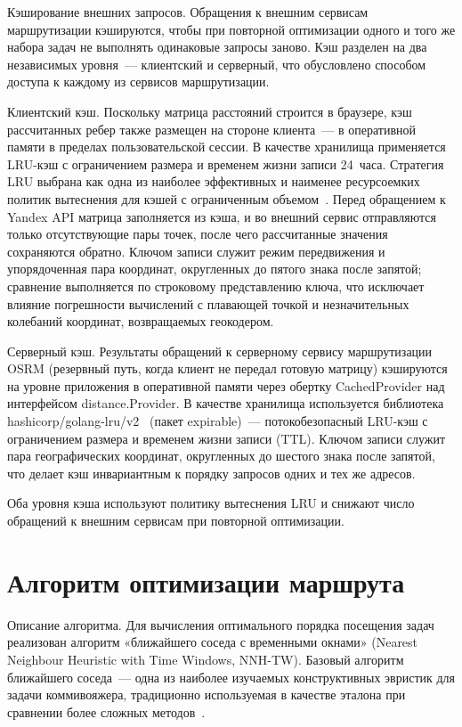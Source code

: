 Кэширование внешних запросов. Обращения к внешним сервисам маршрутизации
кэшируются, чтобы при повторной оптимизации одного и того же набора задач
не выполнять одинаковые запросы заново. Кэш разделен на два независимых
уровня~--- клиентский и серверный, что обусловлено способом доступа
к каждому из сервисов маршрутизации.

Клиентский кэш. Поскольку матрица расстояний строится в браузере, кэш рассчитанных ребер также размещен на стороне
клиента~--- в оперативной памяти в пределах пользовательской сессии. В качестве хранилища
применяется LRU-кэш с ограничением размера и временем жизни записи 24~часа.
Стратегия LRU выбрана как одна из наиболее эффективных и наименее ресурсоемких политик
вытеснения для кэшей с ограниченным объемом~\cite{kuduhov2014lru}.
Перед обращением к Yandex API матрица заполняется из
кэша, и во внешний сервис отправляются только отсутствующие пары точек, после
чего рассчитанные значения сохраняются обратно. Ключом записи служит режим
передвижения и упорядоченная пара координат, округленных до пятого знака после
запятой; сравнение выполняется по строковому
представлению ключа, что исключает влияние погрешности вычислений с плавающей
точкой и незначительных колебаний координат, возвращаемых геокодером.

Серверный кэш. Результаты обращений к серверному сервису маршрутизации OSRM
(резервный путь, когда клиент не передал готовую матрицу) кэшируются на уровне
приложения в оперативной памяти через обертку CachedProvider над интерфейсом
distance.Provider. В качестве хранилища используется библиотека
hashicorp/golang-lru/v2~\cite{golang_lru} (пакет expirable)~--- потокобезопасный
LRU-кэш с ограничением размера и временем жизни записи (TTL). Ключом записи
служит пара географических координат, округленных до шестого знака после запятой,
что делает кэш инвариантным к порядку запросов одних и тех же адресов.

Оба уровня кэша используют политику вытеснения LRU и снижают число обращений
к внешним сервисам при повторной оптимизации.

\section{Алгоритм оптимизации маршрута}

Описание алгоритма. Для вычисления оптимального порядка посещения задач реализован алгоритм
«ближайшего соседа с временными окнами» (Nearest Neighbour Heuristic with
Time Windows, NNH-TW).
Базовый алгоритм ближайшего соседа~--- одна из наиболее изучаемых
конструктивных эвристик для задачи коммивояжера, традиционно
используемая в качестве эталона при сравнении более сложных
методов~\cite{garey1982intractable}.

